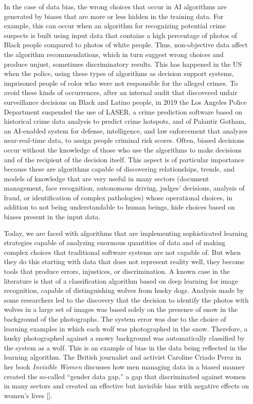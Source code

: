 In the case of data bias, the wrong choices that occur in AI algorithms are generated by biases that are more or less hidden in the training data. For example, this can occur when an algorithm for recognizing potential crime suspects is built using input data that contains a high percentage of photos of Black people compared to photos of white people. Thus, non-objective data affect the algorithm recommendations, which in turn suggest wrong choices and produce unjust, sometimes discriminatory results. This has happened in the US when the police, using these types of algorithms as decision support systems, imprisoned people of color who were not responsible for the alleged crimes. To avoid these kinds of occurrences, after an internal audit that discovered unfair surveillance decisions on Black and Latino people, in 2019 the Los Angeles Police Department suspended the use of LASER, a crime prediction software based on historical crime data analysis to predict crime hotspots, and of Palantir Gotham, an AI-enabled system for defense, intelligence, and law enforcement that analyzes near-real-time data, to assign \hbox{people} criminal risk scores. Often, biased decisions occur without the knowledge of those who use the algorithms to make decisions and of the recipient of the decision itself. This aspect is of particular importance because these are algorithms capable of discovering relationships, trends, and models of knowledge that are very useful in many sectors (document management, face recognition, autonomous driving, judges' decisions, analysis of fraud, or identification of complex pathologies) whose operational choices, in addition to not being understandable to human beings, hide choices based on biases present in the input data.

Today, we are faced with algorithms that are implementing sophisticated learning strategies capable of analyzing enormous quantities of data and of making complex choices that traditional software systems are not capable of. But when they do this starting with data that does not represent reality well, they become tools that produce errors, injustices, or discrimination. A known case in the literature is that of a classification algorithm based on deep learning for image recognition, capable of distinguishing wolves from husky dogs. Analysis made by some researchers led to the discovery that the decision to identify the photos with wolves in a large set of images was based solely on the presence of snow in the background of the photographs. The system error was due to the choice of learning examples in which each wolf was photographed in the snow. Therefore, a husky photographed against a snowy background was automatically classified by the system as a wolf. This is an example of bias in the data being reflected in the learning algorithm. The British journalist and activist Caroline Criado Perez in her book \textit{Invisible Women} discusses how men managing data in a biased manner created the so-called ``\hbox{gender} data gap,'' a gap that discriminated against women in many sectors and created an effective but invisible bias with negative effects on women's lives [\citealt{chap:7:CriadoPerez:2019}].


